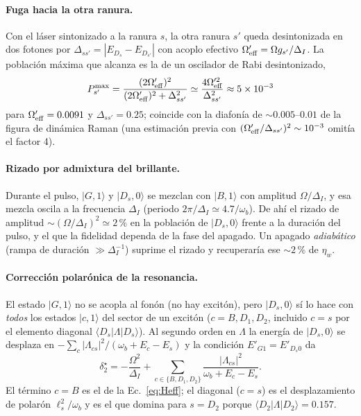 \documentclass[11pt,a4paper]{article}
\newcommand{\ket}[1]{|#1\rangle}
\newcommand{\wb}{\omega_b}
\begin{document}
\paragraph{Fuga hacia la otra ranura.}
Con el láser sintonizado a la ranura $s$, la otra ranura $s'$ queda desintonizada en dos fotones por $\Delta_{ss'}=|E_{D_s}-E_{D_{s'}}|$ con acoplo efectivo $\Omega_{\rm eff}'=\Omega g_{s'}/\Delta_I$.
La población máxima que alcanza es la de un oscilador de Rabi desintonizado,
\begin{equation}
P_{s'}^{\max}=\frac{(2\Omega_{\rm eff}')^2}{(2\Omega_{\rm eff}')^2+\Delta_{ss'}^2}\simeq\frac{4\Omega_{\rm eff}'^2}{\Delta_{ss'}^2}\approx5\times10^{-3}
\end{equation}
para $\Omega_{\rm eff}'=0.0091$ y $\Delta_{ss'}=0.25$; coincide con la diafonía de $\sim0.005$--$0.01$ de la figura de dinámica Raman
(una estimación previa con $(\Omega'_{\rm eff}/\Delta_{ss'})^2\sim10^{-3}$ omitía el factor 4).

\paragraph{Rizado por admixtura del brillante.}
Durante el pulso, $\ket{G,1}$ y $\ket{D_s,0}$ se mezclan con $\ket{B,1}$ con amplitud $\Omega/\Delta_I$, y esa mezcla oscila a la frecuencia $\Delta_I$ (periodo $2\pi/\Delta_I\simeq4.7/\wb$).
De ahí el rizado de amplitud $\sim(\Omega/\Delta_I)^2\simeq2$\,\% en la población de $\ket{D_s,0}$ frente a la duración del pulso, y el que la fidelidad dependa de la fase del apagado.
Un apagado \emph{adiabático} (rampa de duración $\gg\Delta_I^{-1}$) suprime el rizado y recuperaría ese $\sim2$\,\% de $\eta_w$.

\paragraph{Corrección polarónica de la resonancia.}
El estado $\ket{G,1}$ no se acopla al fonón (no hay excitón), pero $\ket{D_s,0}$ sí lo hace con \emph{todos} los estados $\ket{c,1}$ del sector de un excitón
($c=B,D_1,D_2$, incluido $c=s$ por el elemento diagonal $\langle D_s|\Lambda|D_s\rangle$). Al segundo orden en $\Lambda$ la energía de $\ket{D_s,0}$ se desplaza en
$-\sum_c|\Lambda_{cs}|^2/(\wb+E_c-E_s)$ y la condición $E'_{G1}=E'_{D_s0}$ da
\begin{equation}
\delta_2^\star=-\frac{\Omega^2}{\Delta_I}+\sum_{c\in\{B,D_1,D_2\}}\frac{|\Lambda_{cs}|^2}{\wb+E_c-E_s}. \label{eq:d2star}
\end{equation}
El término $c=B$ es el de la Ec.~\eqref{eq:Heff}; el diagonal ($c=s$) es el desplazamiento de polarón $\ell_s^2/\wb$ y es el que domina para $s=D_2$ porque $\langle D_2|\Lambda|D_2\rangle=0.157$.
\end{document}
